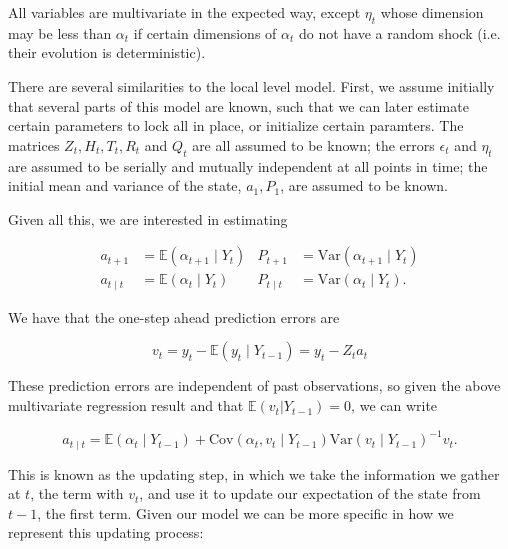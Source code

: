 \documentclass{tufte-book}
\begin{document}
\noindent All variables are multivariate in the expected way, except $\eta_t$ whose dimension may be less than $\alpha_t$ if certain dimensions of $\alpha_t$ do not have a random shock (i.e. their evolution is deterministic).

There are several similarities to the local level model. First, we assume initially that several parts of this model are known, such that we can later estimate certain parameters to lock all in place, or initialize certain paramters. The matrices $Z_t, H_t, T_t, R_t$ and $Q_t$ are all assumed to be known; the errors $\epsilon_t$ and $\eta_t$ are assumed to be serially and mutually independent at all points in time; the initial mean and variance of the state, $a_1, P_1$, are assumed to be known.

Given all this, we are interested in estimating

\begin{align*}
a_{t+1} &= \mathbb{E}(\alpha_{t+1} \mid Y_t) & P_{t+1} &= \text{Var}(\alpha_{t+1} \mid Y_t) \\
a_{t \mid t} &= \mathbb{E}(\alpha_{t} \mid Y_t) & P_{t \mid t} &= \text{Var}(\alpha_{t} \mid Y_t).
\end{align*}

\noindent We have that the one-step ahead prediction errors are

\[
v_t = y_t - \mathbb{E}(y_t \mid Y_{t-1}) = y_t - Z_t a_t
\]

These prediction errors are independent of past observations, so given the above multivariate regression result and that $\mathbb{E}(v_t | Y_{t-1}) = 0$, we can write

\[
a_{t \mid t} = \mathbb{E}(\alpha_t \mid Y_{t-1}) + \text{Cov}(\alpha_t, v_t \mid Y_{t-1}) \text{Var}(v_t \mid Y_{t-1})^{-1} v_t.
\]

\noindent This is known as the updating step, in which we take the information we gather at $t$, the term with $v_t$, and use it to update our expectation of the state from $t-1$, the first term. Given our model we can be more specific in how we represent this updating process:
\end{document}
